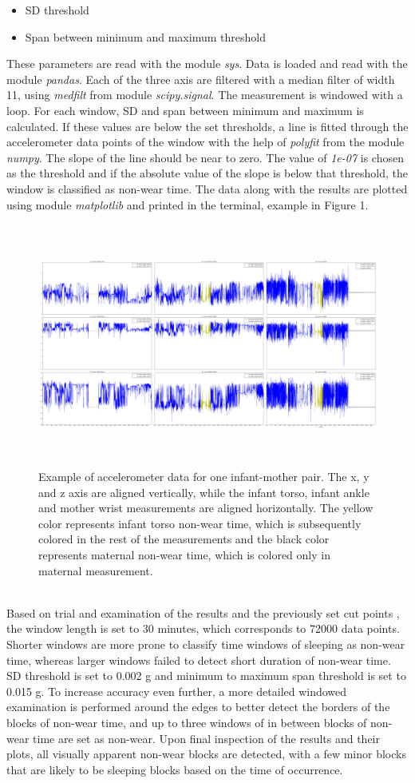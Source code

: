 \documentclass{article}
\begin{document}
{\begin{itemize}
\item SD threshold
\item Span between minimum and maximum threshold
\end{itemize}
These parameters are read with the module \textit{sys}. Data is loaded and read with the module \textit{pandas}. Each of the three axis are filtered with a median filter of width 11, using \textit{medfilt} from module \textit{scipy.signal}. The measurement is windowed with a loop. For each window, SD and span between minimum and maximum is calculated. If these values are below the set thresholds, a line is fitted through the accelerometer data points of the window with the help of \textit{polyfit} from the module \textit{numpy}. The slope of the line should be near to zero. The value of \textit{1e-07} is chosen as the threshold and if the absolute value of the slope is below that threshold, the window is classified as non-wear time. The data along with the results are plotted using module \textit{matplotlib} and printed in the terminal, example in Figure 1.
\newpage
\begin{figure}[h]
\includegraphics[width=15cm, height=8cm]{21NoWearTimeLabeled.png}
\caption{Example of accelerometer data for one infant-mother pair. The x, y and z axis are aligned vertically, while the infant torso, infant ankle and mother wrist measurements are aligned horizontally. The yellow color represents infant torso non-wear time, which is subsequently colored in the rest of the measurements and the black color represents maternal non-wear time, which is colored only in maternal measurement.}
\end{figure}
\\
Based on trial and examination of the results and the previously set cut points \cite{ref2}, the window length is set to 30 minutes, which corresponds to 72000 data points. Shorter windows are more prone to classify time windows of sleeping as non-wear time, whereas larger windows failed to detect short duration of non-wear time. SD threshold is set to 0.002 g and minimum to maximum span threshold is set to 0.015 g. To increase accuracy even further, a more detailed windowed examination is performed around the edges to better detect the borders of the blocks of non-wear time, and up to three windows of in between blocks of non-wear time are set as non-wear. 
Upon final inspection of the results and their plots, all visually apparent non-wear blocks are detected, with a few minor blocks that are likely to be sleeping blocks based on the time of occurrence. 
\newpage
}
\end{document}
